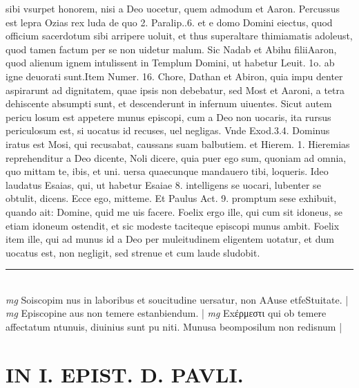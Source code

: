 \documentclass{article}
\begin{document}
\begin{pages}
sibi vsurpet honorem, nisi a Deo uocetur, quem admodum et Aaron. Percussus est lepra Ozias rex luda de quo 2. Paralip..6. et e domo Domini eiectus, quod officium sacerdotum sibi arripere uoluit, et thus superaltare thimiamatis adoleust, quod tamen factum per se non uidetur malum. Sic Nadab et Abihu filiiAaron, quod alienum ignem intulissent in Templum Domini, ut habetur Leuit. 1o. ab igne deuorati sunt.Item Numer. 16. Chore, Dathan et Abiron, quia impu denter aspirarunt ad dignitatem, quae ipsis non debebatur, sed Most et Aaroni, a tetra dehiscente absumpti sunt, et descenderunt in infernum uiuentes. Sicut autem pericu losum est appetere munus episcopi, cum a Deo non uocaris, ita rursus periculosum est, si uocatus id recuses, uel negligas. Vnde Exod.3.4. Dominus iratus est Mosi, qui recusabat, caussans suam balbutiem. et Hierem. 1. Hieremias reprehenditur a Deo dicente, Noli dicere, quia puer ego sum, quoniam ad omnia, quo mittam te, ibis, et uni. uersa quaecunque mandauero tibi, loqueris. Ideo laudatus Esaias, qui, ut habetur Esaiae 8. intelligens se uocari, lubenter se obtulit, dicens. Ecce ego, mitteme. Et Paulus Act. 9. promptum sese exhibuit, quando ait: Domine, quid me uis facere. Foelix ergo ille, qui cum sit idoneus, se etiam idoneum ostendit, et sic modeste taciteque episcopi munus ambit. Foelix item ille, qui ad munus id a Deo per muleitudinem eligentem uotatur, et dum uocatus est, non negligit, sed strenue et cum laude sludobit.  \pend
\vspace{0.5cm}\noindent
\vspace{0.2cm}\rule{1cm}{0.2pt}\\ 
\hspace{0.2cm}\textit{mg}
\footnotesize Soiscopim nus in laboribus et soucitudine uersatur, non AAuse etfeStuitate. 
\normalsize| 
\hspace{0.2cm}\textit{mg}
\footnotesize Episcopine aus non temere estanbiendum. 
\normalsize| 
\hspace{0.2cm}\textit{mg}
\footnotesize Exέρμεστι qui ob temere affectatum ntunuis, diuinius sunt pu niti. Munusa beomposilum non redisnum 
\normalsize| 
\section*{IN I. EPIST. D. PAVLI. }
\marginpar{[ p.76 ]}
{}

\end{pages}
\end{document}
